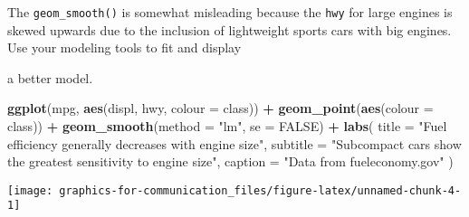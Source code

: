 \documentclass[]{book}
\newenvironment{Shaded}{\begin{snugshade}}{\end{snugshade}}
\newcommand{\DataTypeTok}[1]{\textcolor[rgb]{0.13,0.29,0.53}{#1}}
\newcommand{\KeywordTok}[1]{\textcolor[rgb]{0.13,0.29,0.53}{\textbf{#1}}}
\newcommand{\NormalTok}[1]{#1}
\newcommand{\OperatorTok}[1]{\textcolor[rgb]{0.81,0.36,0.00}{\textbf{#1}}}
\newcommand{\OtherTok}[1]{\textcolor[rgb]{0.56,0.35,0.01}{#1}}
\newcommand{\StringTok}[1]{\textcolor[rgb]{0.31,0.60,0.02}{#1}}
\theoremstyle{plain}
\theoremstyle{remark}
\theoremstyle{definition}
\theoremstyle{definition}
\theoremstyle{definition}
\theoremstyle{remark}
\begin{document}
The \texttt{geom\_smooth()} is somewhat misleading because the
\texttt{hwy} for large engines is skewed upwards due to the inclusion of
lightweight sports cars with big engines. Use your modeling tools to fit
and display

a better model.

\begin{Shaded}
\begin{Highlighting}[]
\KeywordTok{ggplot}\NormalTok{(mpg, }\KeywordTok{aes}\NormalTok{(displ, hwy, }\DataTypeTok{colour =}\NormalTok{ class)) }\OperatorTok{+}
\StringTok{  }\KeywordTok{geom_point}\NormalTok{(}\KeywordTok{aes}\NormalTok{(}\DataTypeTok{colour =}\NormalTok{ class)) }\OperatorTok{+}
\StringTok{  }\KeywordTok{geom_smooth}\NormalTok{(}\DataTypeTok{method =} \StringTok{"lm"}\NormalTok{, }\DataTypeTok{se =} \OtherTok{FALSE}\NormalTok{) }\OperatorTok{+}
\StringTok{  }\KeywordTok{labs}\NormalTok{(}
    \DataTypeTok{title =} \StringTok{"Fuel efficiency generally decreases with engine size"}\NormalTok{,}
    \DataTypeTok{subtitle =} \StringTok{"Subcompact cars show the greatest sensitivity to engine size"}\NormalTok{,}
    \DataTypeTok{caption =} \StringTok{"Data from fueleconomy.gov"}
\NormalTok{  )}
\end{Highlighting}
\end{Shaded}

\begin{center}\texttt{[image: graphics-for-communication\_files/figure-latex/unnamed-chunk-4-1]} \end{center}

\begin{Shaded}
\end{Shaded}
\end{document}
